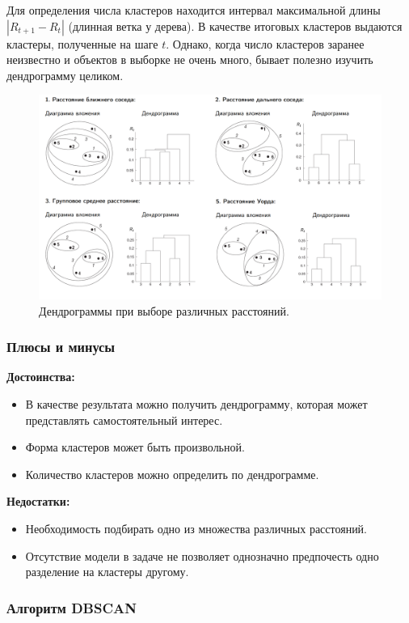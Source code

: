 \documentclass[10pt]{article}
\begin{document}
Для определения числа кластеров находится интервал максимальной длины $|R_{t+1}-R_t|$ (длинная ветка у дерева). В качестве итоговых кластеров выдаются кластеры, полученные на шаге $t$. Однако, когда число кластеров заранее неизвестно и объектов в выборке не очень много, бывает полезно изучить дендрограмму целиком.

\begin{figure}[H]
	\centering
	\includegraphics[scale=0.2]{hier.png}
	\caption{Дендрограммы при выборе различных расстояний.}
\end{figure}


\subsubsection*{Плюсы и минусы}
\textbf{Достоинства:}
\begin{itemize}
	\item В качестве результата можно получить дендрограмму, которая может представлять самостоятельный интерес. 
	\item Форма кластеров может быть произвольной.
	\item Количество кластеров можно определить по дендрограмме.
\end{itemize}

\textbf{Недостатки:}
\begin{itemize}
	\item Необходимость подбирать одно из множества различных расстояний.
	\item Отсутствие модели в задаче не позволяет однозначно предпочесть одно разделение на кластеры другому.	
\end{itemize}

\subsubsection{Алгоритм DBSCAN}
\end{document}
